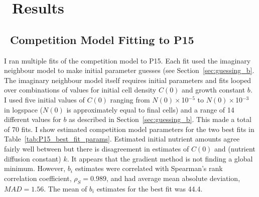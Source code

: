 \graphicspath{{images/}}

\section{\thesection~Results}
\label{sec:results}






\subsection{\thesubsection~Competition Model Fitting to P15}

I ran multiple fits of the competition model to P15. Each fit used the
imaginary neighbour model to make initial parameter guesses (see
Section~\ref{sec:guessing_b}. The imaginary neighbour model itself
requires initial parameters and fits looped over combinations of
values for initial cell density \(C(0)\) and growth constant \(b\). I
used five initial values of \(C(0)\) ranging from
\(N(0)\times\)10\(^{-5}\) to \(N(0)\times\)10\(^{-3}\) in logspace
(\(N(0)\) is approximately equal to final cells) and a range of 14
different values for \(b\) as described in
Section~\ref{sec:guessing_b}. This made a total of 70 fits. I show
estimated competition model parameters for the two best fits in
Table~\ref{tab:P15_best_fit_params}. Estimated initial nutrient
amounts agree fairly well between but there is disagreement in
estimates of \(C(0)\) and (nutrient diffusion constant) \(k\). It
appears that the gradient method is not finding a global
minimum. However, \(b_{i}\) estimates were correlated with Spearman's
rank correlation coefficient, \(\rho_{S} = 0.989\), and had average
mean absolute deviation, \(MAD = 1.56\). The mean of \(b_{i}\)
estimates for the best fit was 44.4.

